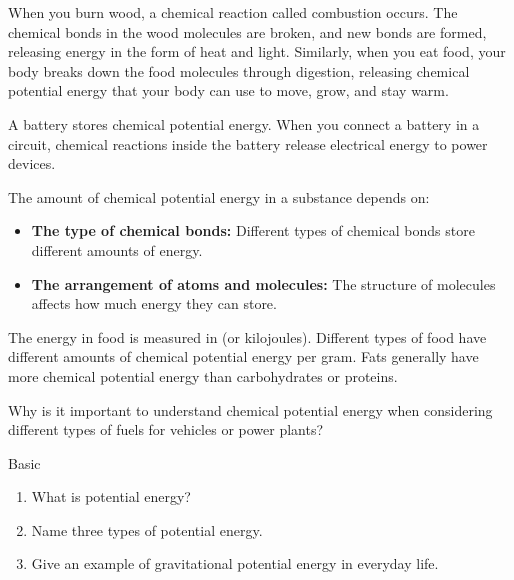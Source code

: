 
When you burn wood, a chemical reaction called combustion occurs.  The chemical bonds in the wood molecules are broken, and new bonds are formed, releasing energy in the form of heat and light.  Similarly, when you eat food, your body breaks down the food molecules through digestion, releasing chemical potential energy that your body can use to move, grow, and stay warm.

\begin{example}
A battery stores chemical potential energy. When you connect a battery in a circuit, chemical reactions inside the battery release electrical energy to power devices.
\end{example}

The amount of chemical potential energy in a substance depends on:

\begin{itemize}
    \item \textbf{The type of chemical bonds:} Different types of chemical bonds store different amounts of energy.
    \item \textbf{The arrangement of atoms and molecules:} The structure of molecules affects how much energy they can store.
\end{itemize}

\begin{marginnote}
The energy in food is measured in  (or kilojoules).  Different types of food have different amounts of chemical potential energy per gram.  Fats generally have more chemical potential energy than carbohydrates or proteins.
\end{marginnote}

\begin{stopandthink}
Why is it important to understand chemical potential energy when considering different types of fuels for vehicles or power plants?
\end{stopandthink}


\begin{tieredquestions}{Basic}
\begin{enumerate}
    \item What is potential energy?
    \item Name three types of potential energy.
    \item Give an example of gravitational potential energy in everyday life.
\end{enumerate}
\end{tieredquestions}

